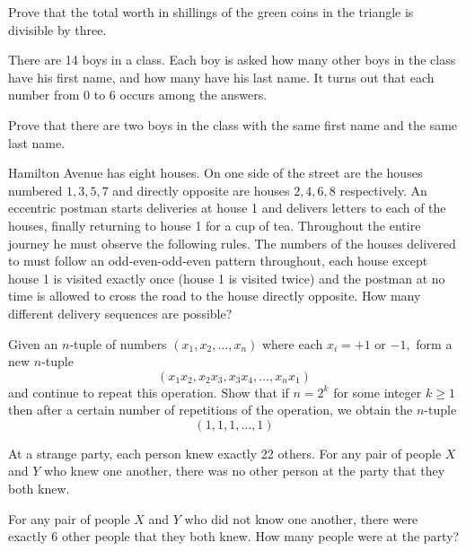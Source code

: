 \documentclass{pset}
\begin{document}
\begin{problems}
\begin{problem}[IrMO 2010 Q4]
Prove that the total worth in shillings of the green coins in the triangle is divisible by three.
\end{problem}

\begin{problem}[IrMO 2010 Q6]
    There are 14 boys in a class. Each boy is asked how many other boys in the class have his first name, and how many have his last name. It turns out that each number from 0 to 6 occurs among the answers.

    Prove that there are two boys in the class with the same first name and the same last name.
\end{problem}


\begin{problem}[IrMO 2009 Q1]
    Hamilton Avenue has eight houses. On one side of the street are the houses numbered \(1,3,5,7\) and directly opposite are houses \(2,4,6,8\) respectively. An eccentric postman starts deliveries at house 1 and delivers letters to each of the houses, finally returning to house 1 for a cup of tea. Throughout the entire journey he must observe the following rules. The numbers of the houses delivered to must follow an odd-even-odd-even pattern throughout, each house except house 1 is visited exactly once (house 1 is visited twice) and the postman at no time is allowed to cross the road to the house directly opposite. How many different delivery sequences are possible?
\end{problem}

\begin{problem}[IrMO 2009 Q4]
    Given an \(n\)-tuple of numbers \(\left(x_{1}, x_{2}, \ldots, x_{n}\right)\) where each \(x_{i}=+1\) or \(-1,\) form a new \(n\)-tuple
$$
\left(x_{1} x_{2}, x_{2} x_{3}, x_{3} x_{4}, \ldots, x_{n} x_{1}\right)
$$
and continue to repeat this operation. Show that if \(n=2^{k}\) for some integer \(k \geq 1\) then after a certain number of repetitions of the operation, we obtain the \(n\)-tuple
$$
(1,1,1, \ldots, 1)
$$

\end{problem}

\begin{problem}[IrMO 2009 Q9]
    At a strange party, each person knew exactly 22 others.
    For any pair of people \(X\) and \(Y\) who knew one another, there was no other person at the party that they both knew.
    
    For any pair of people \(X\) and \(Y\) who did not know one another, there were exactly
    6 other people that they both knew.
    How many people were at the party?
\end{problem}


\end{problems}
\end{document}
